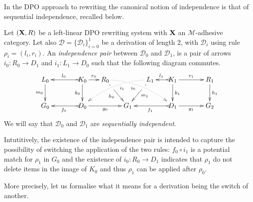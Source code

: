 \documentclass[a4paper,UKenglish,cleveref,pdftex, thm-restate,numberwithinsect]{lipics}
\def\R{\mathsf{R}}
\def\X{\textbf {\textup{X}}}
\newcommand{\dder}[1]{\mathscr{#1}}
\newcommand{\der}[1]{\underline{\dder{#1}}}
\begin{document}
In the DPO approach to rewriting the canonical notion of independence is that of sequential independence, recalled below.

\begin{definition}
  \label{de:sequential-independence}
  Let $(\X, \R)$ be a left-linear DPO rewriting system with $\X$ an
  $\mathcal{M}$-adhesive category. Let also
  $\der{D}=\{\dder{D}_i\}_{i=0}^1$ be a derivation of length $2$, with
  $\dder{D}_i$ using rule $\rho_i = (l_i,r_i)$.  An \emph{independence
    pair} between $\dder{D}_0$ and $\dder{D}_1$, is a pair of arrows
  $i_0\colon R_0\to D_1$ and $i_1\colon L_1\to D_0$ such that the
  following diagram commutes.
  \[\xymatrix@C=15pt{L_0 \ar[d]_{m_0}&& K_0 \ar[d]_{k_0}\ar@{>->}[ll]_{l_0} \ar[r]^{r_0} & R_0 \ar@{.>}@/^.35cm/[drrr]|(.3)\hole_(.4){i_0} \ar[dr]|(.3)\hole_{h_0} && L_1 \ar@{.>}@/_.35cm/[dlll]^(.4){i_1} \ar[dl]|(.3)\hole^{m_1}& K_1 \ar[d]^{k_1}\ar@{>->}[l]_{l_1} \ar[rr]^{r_1} && R_1 \ar[d]^{h_1}\\G_0 && \ar@{>->}[ll]^{f_0} D_0 \ar[rr]_{g_0}&& G_1  && \ar@{>->}[ll]^{f_1} D_1 \ar[rr]_{g_1}&& G_2}\]
  We will say that $\dder{D}_0$ and $\dder{D}_1$ are
  \emph{sequentially independent}.
\end{definition}

Intutitively, the existence of the independence pair is intended to
capture the possibility of switching the application of the two rules:
$f_0 \circ i_1$ is a potential match for $\rho_1$ in $G_0$ and the
existence of $i_0 : R_0 \to D_1$ indicates that $\rho_1$ do not delete
items in the image of $K_0$ and thus $\rho_1$ can be applied after
$\rho_0$.

More precisely, let us formalise what it means for a derivation being the switch of another.

\end{document}
